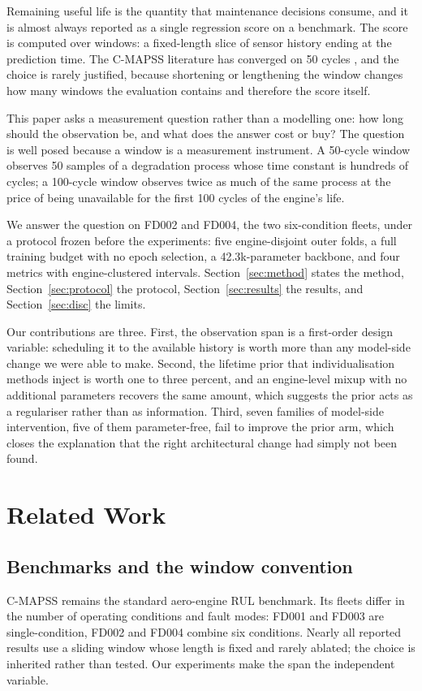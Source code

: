 \documentclass[journal]{IEEEtran}
\begin{document}
Remaining useful life is the quantity that maintenance decisions consume, and it is almost always reported as a single regression score on a benchmark. The score is computed over windows: a fixed-length slice of sensor history ending at the prediction time. The C-MAPSS literature has converged on 50 cycles \cite{saxena2008}, and the choice is rarely justified, because shortening or lengthening the window changes how many windows the evaluation contains and therefore the score itself.

This paper asks a measurement question rather than a modelling one: how long should the observation be, and what does the answer cost or buy? The question is well posed because a window is a measurement instrument. A 50-cycle window observes 50 samples of a degradation process whose time constant is hundreds of cycles; a 100-cycle window observes twice as much of the same process at the price of being unavailable for the first 100 cycles of the engine's life.

We answer the question on FD002 and FD004, the two six-condition fleets, under a protocol frozen before the experiments: five engine-disjoint outer folds, a full training budget with no epoch selection, a 42.3k-parameter backbone, and four metrics with engine-clustered intervals. Section~\ref{sec:method} states the method, Section~\ref{sec:protocol} the protocol, Section~\ref{sec:results} the results, and Section~\ref{sec:disc} the limits.

Our contributions are three. First, the observation span is a first-order design variable: scheduling it to the available history is worth more than any model-side change we were able to make. Second, the lifetime prior that individualisation methods inject is worth one to three percent, and an engine-level mixup with no additional parameters recovers the same amount, which suggests the prior acts as a regulariser rather than as information. Third, seven families of model-side intervention, five of them parameter-free, fail to improve the prior arm, which closes the explanation that the right architectural change had simply not been found.

\section{Related Work}

\subsection{Benchmarks and the window convention}
C-MAPSS \cite{saxena2008} remains the standard aero-engine RUL benchmark. Its fleets differ in the number of operating conditions and fault modes: FD001 and FD003 are single-condition, FD002 and FD004 combine six conditions. Nearly all reported results use a sliding window whose length is fixed and rarely ablated; the choice is inherited rather than tested. Our experiments make the span the independent variable.
\end{document}
